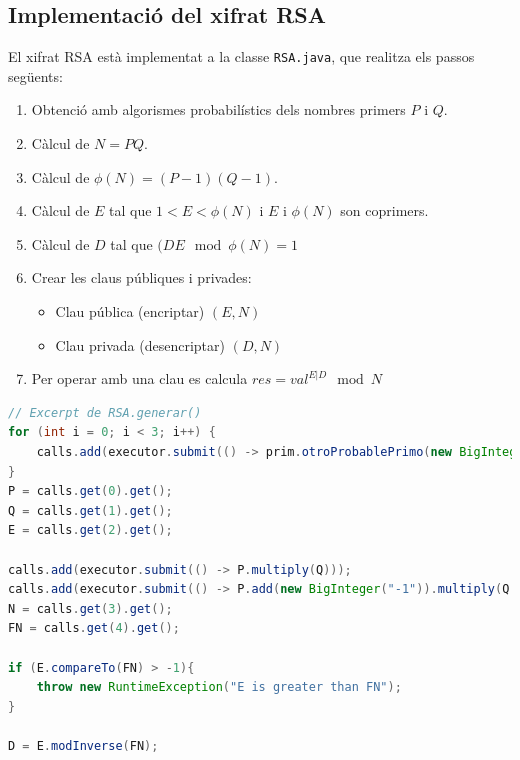 \documentclass{ieeetj}
\begin{document}
\subsection{Implementació del xifrat RSA}
El xifrat RSA està implementat a la classe \texttt{RSA.java}, que realitza els passos següents:
\begin{enumerate}
  \item Obtenció amb algorismes probabilístics dels nombres primers $P$ i $Q$.
  \item Càlcul de $N = PQ$.
  \item Càlcul de $\phi(N) = (P-1)(Q-1)$.
  \item Càlcul de $E$ tal que $1 < E < \phi(N)$ i $E$ i $\phi(N)$ son coprimers.
  \item Càlcul de $D$ tal que $(DE\mod \phi(N)=1$
  \item Crear les claus públiques i privades:
    \begin{itemize}
      \item Clau pública (encriptar) $(E, N)$
      \item Clau privada (desencriptar) $(D, N)$
    \end{itemize}
  \item Per operar amb una clau es calcula $res = val^{E|D}\mod N$
\end{enumerate}

\begin{lstlisting}[language = Java, breaklines = true]
// Excerpt de RSA.generar()
for (int i = 0; i < 3; i++) {
    calls.add(executor.submit(() -> prim.otroProbablePrimo(new BigInteger("1" + "0".repeat(n)))));
}
P = calls.get(0).get();
Q = calls.get(1).get();
E = calls.get(2).get();

calls.add(executor.submit(() -> P.multiply(Q)));
calls.add(executor.submit(() -> P.add(new BigInteger("-1")).multiply(Q.add(new BigInteger("-1")))));
N = calls.get(3).get();
FN = calls.get(4).get();

if (E.compareTo(FN) > -1){
    throw new RuntimeException("E is greater than FN");
}

D = E.modInverse(FN);
 
\end{lstlisting}
\end{document}
